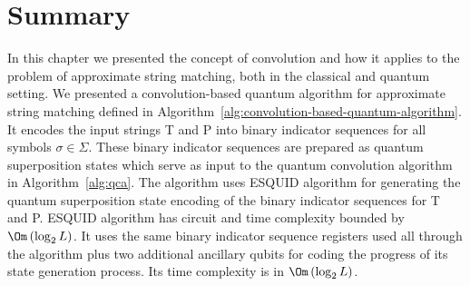 


\section{Summary}
In this chapter we presented the concept of convolution and how it applies to the problem of approximate string matching, both in the classical and quantum setting. We presented a convolution-based quantum algorithm for approximate string matching defined in Algorithm~\ref{alg:convolution-based-quantum-algorithm}. It encodes the input strings T and P into binary indicator sequences for all symbols $\sigma \in \Sigma$. These binary indicator sequences are prepared as quantum superposition states which serve as input to the quantum convolution algorithm in Algorithm~\ref{alg:qca}. The algorithm uses ESQUID algorithm \cite{Rosenbaum2009} for generating the quantum superposition state encoding of the binary indicator sequences for T and P. ESQUID algorithm has circuit and time complexity bounded by $\Om\left( \log_2 L \right)$. It uses the same binary indicator sequence registers used all through the algorithm plus two additional ancillary qubits for coding the progress of its state generation process. Its time complexity is in $\Om\left( \log_2 L \right)$.


